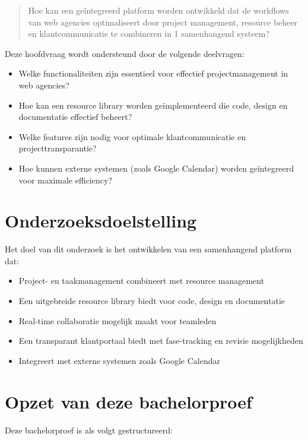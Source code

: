 \begin{quote}
    Hoe kan een geïntegreerd platform worden ontwikkeld dat de workflows van web agencies optimaliseert door project management, resource beheer en klantcommunicatie te combineren in 1 samenhangend systeem?
\end{quote}

Deze hoofdvraag wordt ondersteund door de volgende deelvragen:

\begin{itemize}
    \item Welke functionaliteiten zijn essentieel voor effectief projectmanagement in web agencies?
    \item Hoe kan een resource library worden geïmplementeerd die code, design en documentatie effectief beheert?
    \item Welke features zijn nodig voor optimale klantcommunicatie en projecttransparantie?
    \item Hoe kunnen externe systemen (zoals Google Calendar) worden geïntegreerd voor maximale efficiency?
\end{itemize}

\section{Onderzoeksdoelstelling}
\label{sec:onderzoeksdoelstelling}

Het doel van dit onderzoek is het ontwikkelen van een samenhangend platform dat:

\begin{itemize}
    \item Project- en taakmanagement combineert met resource management
    \item Een uitgebreide resource library biedt voor code, design en documentatie
    \item Real-time collaboratie mogelijk maakt voor teamleden
    \item Een transparant klantportaal biedt met fase-tracking en revisie mogelijkheden
    \item Integreert met externe systemen zoals Google Calendar
\end{itemize}

\section{Opzet van deze bachelorproef}
\label{sec:opzet}

Deze bachelorproef is als volgt gestructureerd:

